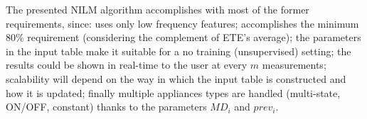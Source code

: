 The presented NILM algorithm accomplishes with most of the former requirements, since: uses only low frequency features; accomplishes the minimum 80\% requirement (considering the complement of ETE's average); the parameters in the input table make it suitable for a no training (unsupervised) setting; the results could be shown in real-time to the user at every $m$ measurements; scalability will depend on the way in which the input table is constructed and how it is updated; finally multiple appliances types are handled (multi-state, ON/OFF, constant) thanks to the parameters $MD_i$ and $prev_i$. 
